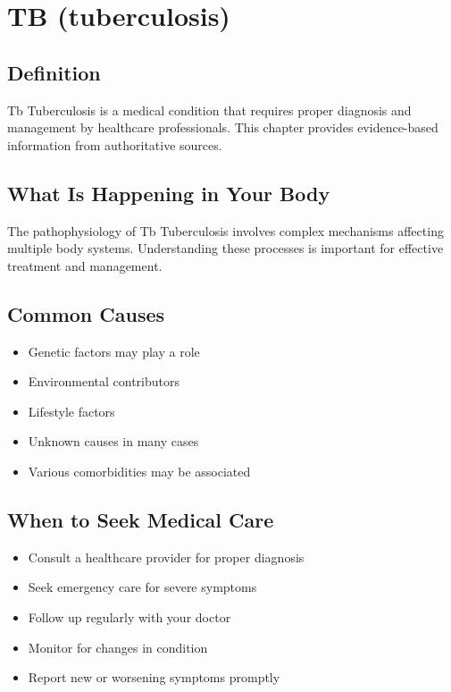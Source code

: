 
\chapter{TB (tuberculosis)}

\section*{Definition}
Tb Tuberculosis is a medical condition that requires proper diagnosis and management by healthcare professionals. This chapter provides evidence-based information from authoritative sources.

\section*{What Is Happening in Your Body}
The pathophysiology of Tb Tuberculosis involves complex mechanisms affecting multiple body systems. Understanding these processes is important for effective treatment and management.

\section*{Common Causes}
\begin{itemize}
  \item Genetic factors may play a role
  \item Environmental contributors
  \item Lifestyle factors
  \item Unknown causes in many cases
  \item Various comorbidities may be associated
\end{itemize}

\section*{When to Seek Medical Care}
\begin{itemize}
  \item Consult a healthcare provider for proper diagnosis
  \item Seek emergency care for severe symptoms
  \item Follow up regularly with your doctor
  \item Monitor for changes in condition
  \item Report new or worsening symptoms promptly
\end{itemize}

